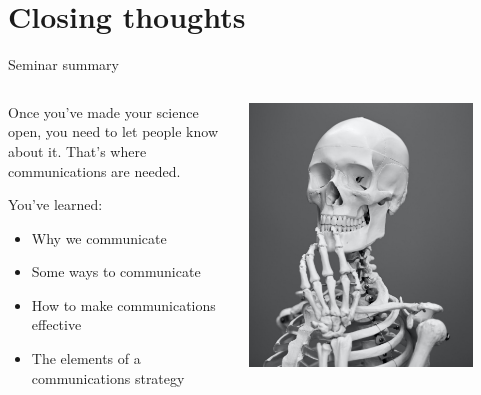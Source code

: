 \section[Closing]{Closing thoughts}
\label{sec:closing}

\begin{frame}{Seminar summary}

	\begin{columns}[c]

		\begin{column}{.45\textwidth}
		
		    Once you've made your science open, you need to let people know about it. That's where communications are needed.
		
		    \vspace{1cm}
		
		    You've learned:
		    \begin{itemize}
			    \item Why we communicate
			    \item Some ways to communicate
			    \item How to make communications effective
			    \item The elements of a communications strategy
		    \end{itemize}
		\end{column}

		\begin{column}{.45\textwidth}
		
		    \includegraphics[width=0.85\textwidth]{images/mathew-schwartz-8rj4sz9YLCI-unsplash-crop.jpg}
		    

\end{column}
\end{columns}
\end{frame}
